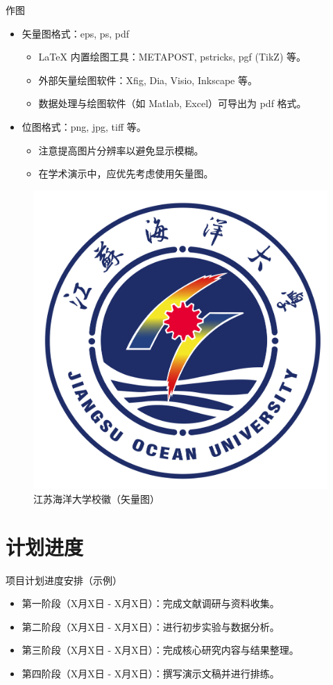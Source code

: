 \documentclass{beamer} %
\begin{document}
\begin{frame}{作图}
    \begin{itemize}
        \item 矢量图格式：eps, ps, pdf
        \begin{itemize}
            \item \LaTeX{} 内置绘图工具：METAPOST, pstricks, pgf (TikZ) 等。
            \item 外部矢量绘图软件：Xfig, Dia, Visio, Inkscape 等。
            \item 数据处理与绘图软件（如 Matlab, Excel）可导出为 pdf 格式。
        \end{itemize}
        \item 位图格式：png, jpg, tiff 等。
        \begin{itemize}
            \item 注意提高图片分辨率以避免显示模糊。
            \item 在学术演示中，应优先考虑使用矢量图。
        \end{itemize}
    \end{itemize}
    \begin{figure}[htpb]
        \centering
        \includegraphics[width=0.2\linewidth]{pic/JOU_logo.jpg} %
        \caption{江苏海洋大学校徽（矢量图）}
    \end{figure}
\end{frame}

\section{计划进度}
\begin{frame}{项目计划进度安排（示例）} %
    \begin{itemize}
        \item 第一阶段（X月X日 - X月X日）：完成文献调研与资料收集。
        \item 第二阶段（X月X日 - X月X日）：进行初步实验与数据分析。
        \item 第三阶段（X月X日 - X月X日）：完成核心研究内容与结果整理。
        \item 第四阶段（X月X日 - X月X日）：撰写演示文稿并进行排练。
    \end{itemize}
\end{frame}
\end{document}

